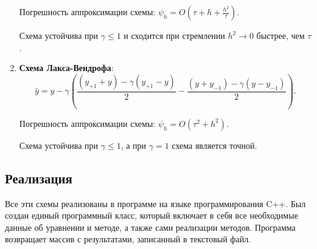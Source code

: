 \documentclass[12pt, a4paper]{article}
\begin{document}
\begin{enumerate}
	Погрешность аппроксимации схемы: $\psi_h = O(\tau + h + \frac{h^2 }{ \tau})$.
	
	Схема устойчива при $\gamma \leq 1 $ и сходится при стремлении $h^2 \to 0$ быстрее, чем $\tau$.
	\bigskip
	\item \textbf{Схема Лакса-Вендрофа}:
	\begin{equation*}
		\widehat{y} = y - \gamma(\dfrac{(y_{+1} + y) - \gamma (y_{+1} - y)}{2} -  \dfrac{(y + y_{-1}) - \gamma (y - y_{-1})}{2}).
		\label{s6}
	\end{equation*}
	
	Погрешность аппроксимации схемы: 
	$\psi_h = O(\tau^2 + h^2)$.
	
	Схема устойчива при $\gamma \leq 1 $, а при $\gamma = 1$ схема является точной. 
	
\end{enumerate}

\subsection{Реализация}

Все эти схемы реализованы в программе на языке программирования C++. Был создан единый программный класс, который включает в себя все необходимые данные об уравнении и методе, а также сами реализации методов. Программа возвращает массив с результатами, записанный в текстовый файл. 
\end{document}
